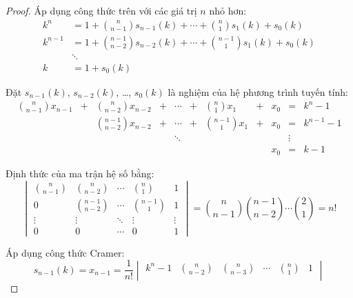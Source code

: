 \documentclass[class=linearalgebra,crop=false]{standalone}
\begin{document}
\begin{proof}
    \par Áp dụng công thức trên với các giá trị $n$ nhỏ hơn:
    \begin{align*}
        k^{n}   & = 1 + \binom{n}{n-1}s_{n-1}(k) + \cdots + \binom{n}{1}s_{1}(k) + s_{0}(k) \\
        k^{n-1} & = 1 + \binom{n-1}{n-2}s_{n-2}(k) + \cdots + \binom{n-1}{1}s_{1}(k) + s_{0}(k) \\
                & \ddots \\
        k       & = 1 + s_{0}(k)
    \end{align*}
    \par Đặt $s_{n-1}(k)$, $s_{n-2}(k)$, \ldots, $s_{0}(k)$ là nghiệm của hệ phương trình tuyến tính:
    \[
        \begin{array}{ccccccccccc}
            \binom{n}{n-1}x_{n-1} & + & \binom{n}{n-2}x_{n-2}   & + & \cdots & + & \binom{n}{1}x_{1}   & + & x_{0} & =      & k^{n} - 1 \\
                                  &   & \binom{n-1}{n-2}x_{n-2} & + & \cdots & + & \binom{n-1}{1}x_{1} & + & x_{0} & =      & k^{n-1} - 1 \\
                                  &   &                         &   & \ddots &   &                     &   &       & \vdots &  \\
                                  &   &                         &   &        &   &                     &   & x_{0} & =      & k - 1
        \end{array}
    \]
    \par Định thức của ma trận hệ số bằng:
    \[
        \begin{vmatrix}
            \binom{n}{n-1} & \binom{n}{n-2}   & \cdots & \binom{n}{1}   & 1      \\
            0              & \binom{n-1}{n-2} & \cdots & \binom{n-1}{1} & 1      \\
            \vdots         & \vdots           & \ddots & \vdots         & \vdots \\
            0              & 0                & \cdots & 0              & 1
        \end{vmatrix}
        = \binom{n}{n-1}\binom{n-1}{n-2}\cdots\binom{2}{1}
        = n!
    \]
    \par Áp dụng công thức Cramer:
    \[
        s_{n-1}(k) = x_{n-1} = \dfrac{1}{n!}
        \begin{vmatrix}
            k^{n} - 1   & \binom{n}{n-2} & \binom{n}{n-3}   & \cdots & \binom{n}{1}   & 1      \\

\end{vmatrix}\]
\end{proof}
\end{document}
